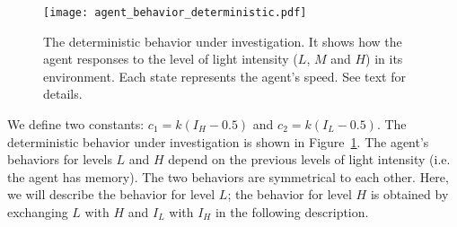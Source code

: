 \begin{figure}[!t]
    \centering
    \texttt{[image: agent\_behavior\_deterministic.pdf]}
    \caption{The deterministic behavior under investigation. It shows how the agent responses to the level of light intensity ($L$, $M$ and $H$) in its environment. Each state represents the agent's speed. See text for details.}
    \label{fig:agent_behavior_deterministic}
\end{figure}

We define two constants: $c_1 = k\left(I_H - 0.5\right)$ and $c_2 = k\left(I_L - 0.5\right)$. The deterministic behavior under investigation is shown in Figure~\ref{fig:agent_behavior_deterministic}. The agent's behaviors for levels $L$ and $H$ depend on the previous levels of light intensity (i.e. the agent has memory). The two behaviors are symmetrical to each other. Here, we will describe the behavior for level $L$; the behavior for level $H$ is obtained by exchanging $L$ with $H$ and $I_L$ with $I_H$ in the following description. 

